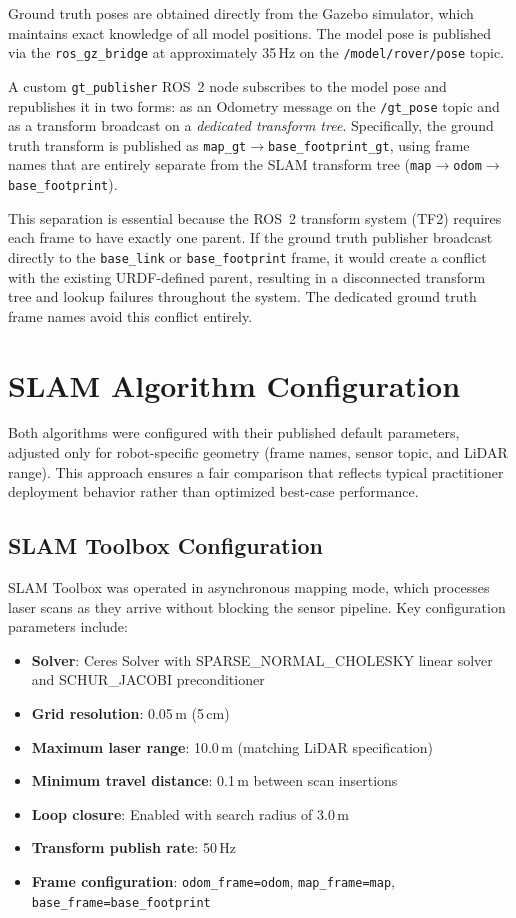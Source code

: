 Ground truth poses are obtained directly from the Gazebo simulator, which maintains exact knowledge of all model positions. The model pose is published via the \texttt{ros\_gz\_bridge} at approximately 35\,Hz on the \texttt{/model/rover/pose} topic.

A custom \texttt{gt\_publisher} ROS~2 node subscribes to the model pose and republishes it in two forms: as an Odometry message on the \texttt{/gt\_pose} topic and as a transform broadcast on a \emph{dedicated transform tree}. Specifically, the ground truth transform is published as \texttt{map\_gt}$\rightarrow$\texttt{base\_footprint\_gt}, using frame names that are entirely separate from the SLAM transform tree (\texttt{map}$\rightarrow$\texttt{odom}$\rightarrow$\texttt{base\_footprint}).

This separation is essential because the ROS~2 transform system (TF2) requires each frame to have exactly one parent. If the ground truth publisher broadcast directly to the \texttt{base\_link} or \texttt{base\_footprint} frame, it would create a conflict with the existing URDF-defined parent, resulting in a disconnected transform tree and lookup failures throughout the system. The dedicated ground truth frame names avoid this conflict entirely.

\section{SLAM Algorithm Configuration}

Both algorithms were configured with their published default parameters, adjusted only for robot-specific geometry (frame names, sensor topic, and LiDAR range). This approach ensures a fair comparison that reflects typical practitioner deployment behavior rather than optimized best-case performance.

\subsection{SLAM Toolbox Configuration}

SLAM Toolbox was operated in asynchronous mapping mode, which processes laser scans as they arrive without blocking the sensor pipeline. Key configuration parameters include:

\begin{itemize}
\item \textbf{Solver}: Ceres Solver with SPARSE\_NORMAL\_CHOLESKY linear solver and SCHUR\_JACOBI preconditioner
\item \textbf{Grid resolution}: 0.05\,m (5\,cm)
\item \textbf{Maximum laser range}: 10.0\,m (matching LiDAR specification)
\item \textbf{Minimum travel distance}: 0.1\,m between scan insertions
\item \textbf{Loop closure}: Enabled with search radius of 3.0\,m
\item \textbf{Transform publish rate}: 50\,Hz
\item \textbf{Frame configuration}: \texttt{odom\_frame=odom}, \texttt{map\_frame=map}, \texttt{base\_frame=base\_footprint}
\end{itemize}

